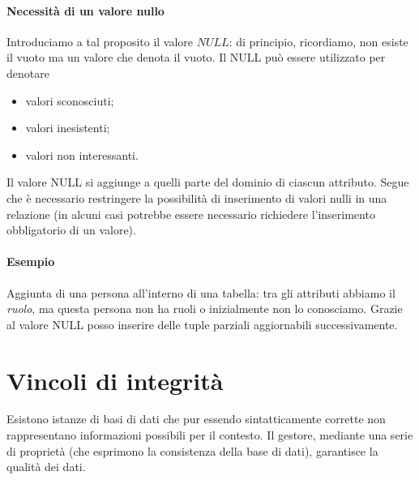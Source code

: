 \paragraph{Necessità di un valore nullo} Introduciamo a tal proposito il valore $NULL$: di principio, ricordiamo, non esiste il vuoto ma un valore che denota il vuoto. Il NULL può essere utilizzato per denotare 
\begin{multicols}{3}
	\begin{itemize}
		\item valori sconosciuti; 
		\item valori inesistenti;
		\item valori non interessanti.
	\end{itemize}
\end{multicols} \noindent Il valore NULL si aggiunge a quelli parte del dominio di ciascun attributo. Segue che è necessario restringere la possibilità di inserimento di valori nulli in una relazione (in alcuni casi potrebbe essere necessario richiedere l'inserimento obbligatorio di un valore).
\paragraph{Esempio} Aggiunta di una persona all'interno di una tabella: tra gli attributi abbiamo il \emph{ruolo}, ma questa persona non ha ruoli o inizialmente non lo conosciamo. Grazie al valore NULL posso inserire delle tuple parziali aggiornabili successivamente.

\section{Vincoli di integrità}
Esistono istanze di basi di dati che pur essendo sintatticamente corrette non rappresentano informazioni possibili per il contesto. Il gestore, mediante una serie di proprietà (che esprimono la consistenza della base di dati), garantisce la qualità dei dati.

